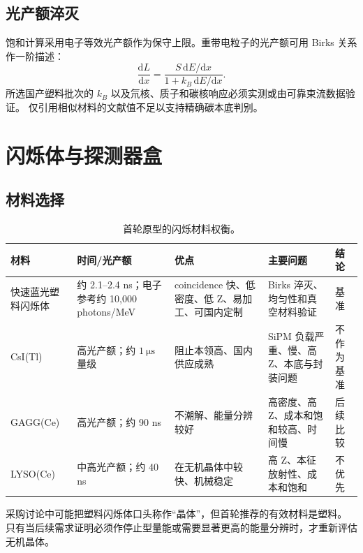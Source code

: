 \documentclass[UTF8,10pt,letterpaper,fontset=none]{ctexart}
\begin{document}
\subsection{光产额淬灭}

饱和计算采用电子等效光产额作为保守上限。重带电粒子的光产额可用
Birks 关系作一阶描述：
\begin{equation}
  \frac{\mathrm{d}L}{\mathrm{d}x}
  =
  \frac{S\,\mathrm{d}E/\mathrm{d}x}
       {1+k_B\,\mathrm{d}E/\mathrm{d}x}.
\end{equation}
所选国产塑料批次的 $k_B$ 以及氘核、质子和碳核响应必须实测或由可靠束流数据验证。
仅引用相似材料的文献值不足以支持精确碳本底判别。

\section{闪烁体与探测器盒}

\subsection{材料选择}

\begin{table}[htbp]
  \centering
  \scriptsize
  \caption{首轮原型的闪烁材料权衡。}
  \begin{tabularx}{\textwidth}{L{0.19\textwidth}L{0.17\textwidth}Y Y L{0.13\textwidth}}
    \toprule
    材料 & 时间/光产额 & 优点 & 主要问题 & 结论 \\
    \midrule
    快速蓝光塑料闪烁体 & 约 2.1--2.4 ns；电子参考约
      10,000 photons/MeV & coincidence 快、低密度、低 Z、易加工、可国内定制 &
      Birks 淬灭、均匀性和真空材料验证 & 基准 \\
    CsI(Tl) & 高光产额；约 $\SI{1}{\micro\second}$ 量级 &
      阻止本领高、国内供应成熟 & SiPM 负载严重、慢、高 Z、本底与封装问题 &
      不作为基准 \\
    GAGG(Ce) & 高光产额；约 90 ns & 不潮解、能量分辨较好 &
      高密度、高 Z、成本和饱和较高、时间慢 & 后续比较 \\
    LYSO(Ce) & 中高光产额；约 40 ns & 在无机晶体中较快、机械稳定 &
      高 Z、本征放射性、成本和饱和 & 不优先 \\
    \bottomrule
  \end{tabularx}
\end{table}

采购讨论中可能把塑料闪烁体口头称作“晶体”，但首轮推荐的有效材料是塑料。
只有当后续需求证明必须作停止型量能或需要显著更高的能量分辨时，才重新评估
无机晶体。
\end{document}
